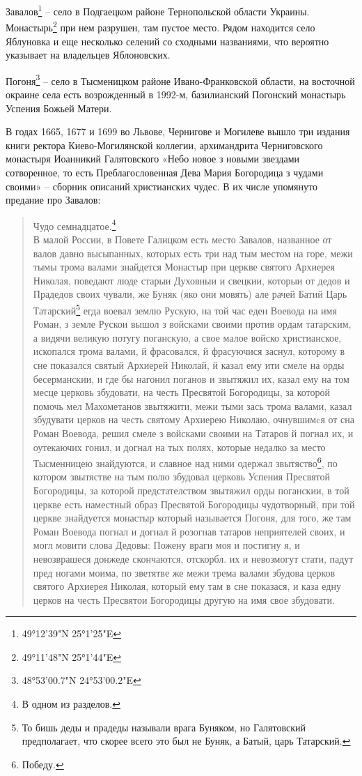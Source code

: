 Завалов\footnote{49°12'39"N 25°1'25"E} – село в Подгаецком районе Тернопольской области Украины. Монастырь\footnote{49°11'48"N 25°1'44"E} при нем разрушен, там пустое место. Рядом находится село Яблуновка и еще несколько селений со сходными названиями, что вероятно указывает на владельцев Яблоновских.

Погоня\footnote{48°53'00.7"N 24°53'00.2"E} – село в Тысменицком районе Ивано-Франко\-вской области, на восточной окраине села есть возрожденный в 1992-м, базилианский Погонский монастырь Успения Божьей Матери.

В годах 1665, 1677 и 1699 во Львове, Чернигове и Могилеве вышло три издания книги ректора Киево-Могилян\-ской коллегии, архимандрита Черниговского монастыря Иоанникий Галятовского «Небо новое з новыми звездами сотворенное, то есть Преблагословенная Дева Мария Богородица з чудами своими» – сборник описаний христианских чудес. В их числе упомянуто предание про Завалов:


\begin{quotation}
Чудо семнадцатое.\footnote{В одном из разделов.}\\

В малой России, в Повете Галицком есть место Завалов, названное от валов давно высыпанных, которых есть три над тым местом на горе, межи тымы трома валами знайдется Монастыр при церкве святого Архиерея Николая, поведают люде старыи Духовныи и свецкии, которыи от дедов и Прадедов своих чували, же Буняк (яко они мовять) але рачей Батий Царь Татарский\footnote{То бишь деды и прадеды называли врага Буняком, но Галятовский предполагает, что скорее всего это был не Буняк, а Батый, царь Татарский.} егда воевал землю Рускую, на той час еден Воевода на имя Роман, з земле Рускои вышол з войсками своими против ордам татарским, а видячи великую потугу поганскую, а свое малое войско христианское, ископался трома валами, й фрасовался, й фрасуючися заснул, которому в сне показался святый Архиерей Николай, й казал ему ити смеле на орды бесерманскии, и где бы нагонил поганов и звытяжил их, казал ему на том месце церковь збудовати, на честь Пресвятой Богородицы, за которой помочь мел Махометанов звытяжити, межи тыми зась трома валами, казал збудувати церков на честь святому Архиерею Николаю, очнувшимcя от сна Роман Воевода, решил смеле з войсками своими на Татаров й погнал их, и оутекаючих гонил, и догнал на тых полях, которые недалко за место Тысменницею знайдуются, и славное над ними одержал звытяство\footnote{Победу.}, по котором звытястве на тым полю збудовал церковь Успения Пресвятой Богородицы, за которой предстателством звытяжил орды поганскии, в той церкве есть наместный образ Пресвятой Богородицы чудотворный, при той церкве знайдуется монастыр который называется Погоня, для того, же там Роман Воевода погнал и догнал й розогнав татаров неприятелей своих, и могл мовити слова Дедовы: Пожену враги моя и постигну я, и невозврашеся донжеде скончаются, отскорбл. их и невозмогут стати, падут пред ногами моима, по зветятве же межи трема валами збудова церков святого Архиерея Николая, который ему там в сне показася, и каза едну церков на честь Пресвятои Богородицы другую на имя свое збудовати.
\end{quotation}

